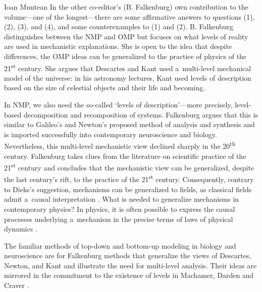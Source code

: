 \begin{recengenv}{Ioan Muntean}
In the other co-editor's  (B. Falkenburg) own contribution to the volume---one of the longest---there are some affirmative answers to questions (1), (2), (3), and (4), and some counterexamples to (1) and (2). B. Falkenburg distinguishes between the NMP and OMP but focuses on what levels of reality are used in mechanistic explanations. She is open to the idea that despite differences, the OMP ideas can be generalized to the practice of physics of the 21\textsuperscript{st} century. She argues that Descartes and Kant used a~multi-level mechanical model of the universe: in his astronomy lectures, Kant used levels of description based on the size of celestial objects and their life and becoming.

In NMP, we also need the so-called ‘levels of description'---more precisely, level-based decomposition and recomposition of systems. Falkenburg argues that this is similar to Galileo's and Newton's proposed method of analysis and synthesis and is imported successfully into contemporary neuroscience and biology. Nevertheless, this multi-level mechanistic view declined sharply in the 20\textsuperscript{th} century. Falkenburg takes clues from the literature on scientific practice of the 21\textsuperscript{st} century and concludes that the mechanistic view can be generalized, despite the last century's rift, to the practice of the 21\textsuperscript{st} century. Consequently, contrary to Dieks's suggestion, mechanisms can be generalized to fields, as classical fields admit a~causal interpretation
\parencites[][p.239]{salmon_scientific_1984}[referred in][p.72]{falkenburg_mechanistic_2019}. %
 What is needed to generalize mechanisms in contemporary physics? In physics, it is often possible to express the causal processes underlying a~mechanism in the precise terms of laws of physical dynamics 
\parencite*[][p.73]{falkenburg_mechanistic_2019}.%


The familiar methods of top-down and bottom-up modeling in biology and neuroscience are for Falkenburg methods that generalize the views of Descartes, Newton, and Kant and illustrate the need for multi-level analysis. Their ideas are mirrored in the commitment to the existence of levels in Machamer, Darden and Craver \parencite*{machamer_thinking_2000}.


\end{recengenv}
